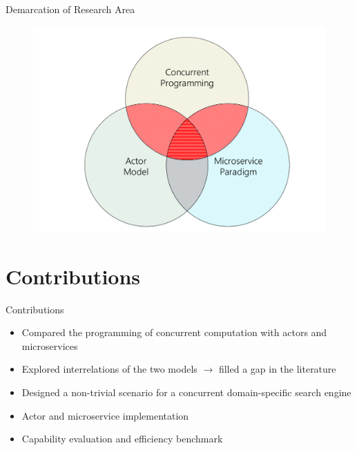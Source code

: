 \documentclass{beamer}
\begin{document}

\begin{frame}{Demarcation of Research Area}

\pause

\begin{center}
  \begin{figure} 
    \includegraphics[width=\textwidth]{graphics/topics-venn.pdf} 
  \end{figure}
\end{center}

\end{frame}


\section{Contributions}


\begin{frame}{Contributions}

\begin{itemize}
  \item Compared the programming of concurrent computation with actors and microservices
  \item Explored interrelations of the two models $\rightarrow$ filled a gap in the literature
  \item Designed a non-trivial scenario for a concurrent domain-specific search engine
  \item Actor and microservice implementation
  \item Capability evaluation and efficiency benchmark
\end{itemize}

\end{frame}
\end{document}
